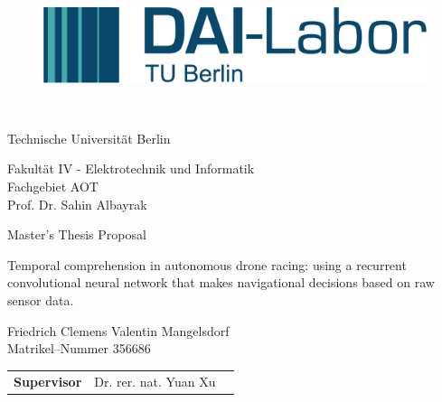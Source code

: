 \thispagestyle{empty}
\begin{figure}[htbp]
	\centering
 \begin{minipage}[b]{41 mm}
   \includegraphics[width=40 mm]{figures/DAI_Logo.png}
 \end{minipage}
\end{figure}

~\vspace{0.5cm}

\begin{center}
\begin{Huge}
Technische Universit\"at Berlin\\
\vspace{1mm}
\end{Huge}{\Large Fakult\"at IV - Elektrotechnik und Informatik\\
Fachgebiet AOT\\
Prof. Dr. Sahin Albayrak}\\

\vspace{26mm}
\begin{LARGE}
Master's Thesis Proposal\\
\end{LARGE}
\vspace{8mm}
\begin{LARGE}
Temporal comprehension in autonomous drone racing:
using a recurrent convolutional neural network that makes navigational decisions based on raw sensor data.\\
\end{LARGE}
\vspace{3 cm}
Friedrich Clemens Valentin Mangelsdorf\\
Matrikel--Nummer 356686\\
\vspace{1cm}
\begin{tabular}{lll}
\textbf{Supervisor} & Dr. rer. nat. Yuan Xu \\%
\end{tabular}

\end{center}

